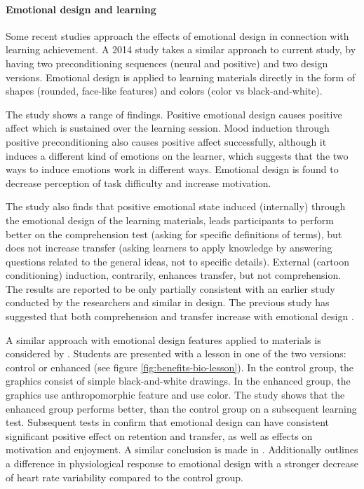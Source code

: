 		\paragraph{Emotional design and learning} 
		
		Some recent studies approach the effects of emotional design in connection with learning achievement. A 2014 study takes a similar approach to current study, by having two preconditioning sequences (neural and positive) and two design versions. Emotional design is applied to learning materials directly in the form of shapes (rounded, face-like features) and colors (color vs black-and-white).
		
		The study shows a range of findings. Positive emotional design causes positive affect which is sustained over the learning session. Mood induction through positive preconditioning also causes positive affect successfully, although it induces a different kind of emotions on the learner, which suggests that the two ways to induce emotions work in different ways. 
		Emotional design is found to decrease perception of task difficulty and increase motivation.
		
		The study also finds that positive emotional state induced (internally) through the emotional design of the learning materials, leads participants to perform better on the comprehension test (asking for specific definitions of terms), but does not increase transfer (asking learners to apply knowledge by answering questions related to the general ideas, not to specific details). External (cartoon conditioning) induction, contrarily, enhances transfer, but not comprehension.
		The results are reported to be only partially consistent with an earlier study conducted by the researchers and similar in design. The previous study has suggested that both comprehension and transfer increase with emotional design \cite{Plass2014, Plass2016}.
		
		A similar approach with emotional design features applied to materials is considered by \cite{Mayer2014}. Students are presented with a lesson in one of the two versions: control or enhanced (see figure \ref{fig:benefits-bio-lesson}). In the control group, the graphics consist of simple black-and-white drawings. In the enhanced group, the graphics use anthropomorphic feature and use color. The study shows that the enhanced group performs better, than the control group on a subsequent learning test. Subsequent tests in \cite{Brom2018} confirm that emotional design can have consistent significant positive effect on retention and transfer, as well as effects on motivation and enjoyment.
		A similar conclusion is made in \cite{Le2018}. Additionally \cite{Le2018} outlines a difference in physiological response to emotional design with a stronger decrease of heart rate variability compared to the control group.


